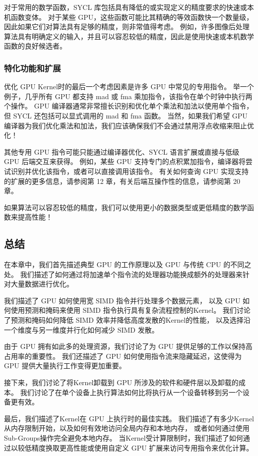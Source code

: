 对于常用的数学函数，SYCL 库包括具有降低的或实现定义的精度要求的快速或本机函数变体。 
对于某些 GPU，这些函数可能比其精确的等效函数快一个数量级，因此如果它们对算法具有足够的精度，则非常值得考虑。 
例如，许多图像后处理算法具有明确定义的输入，并且可以容忍较低的精度，因此是使用快速或本机数学函数的良好候选者。

\subsubsection{特化功能和扩展}
优化 GPU Kernel时的最后一个考虑因素是许多 GPU 中常见的专用指令。 
举一个例子，几乎所有 GPU 都支持 mad 或 fma 乘加指令，该指令在单个时钟中执行两个操作。 
GPU 编译器通常非常擅长识别和优化单个乘法和加法以使用单个指令，但 SYCL 还包括可以显式调用的 mad 和 fma 函数。 
当然，如果我们希望 GPU 编译器为我们优化乘法和加法，我们应该确保我们不会通过禁用浮点收缩来阻止优化！

其他专用 GPU 指令可能只能通过编译器优化、SYCL 语言扩展或直接与低级 GPU 后端交互来获得。 
例如，某些 GPU 支持专门的点积累加指令，编译器将尝试识别并优化该指令，或者可以直接调用该指令。 
有关如何查询 GPU 实现支持的扩展的更多信息，请参阅第 12 章，有关后端互操作性的信息，请参阅第 20 章。

\begin{remark}
	如果算法可以容忍较低的精度，我们可以使用更小的数据类型或更低精度的数学函数来提高性能！
\end{remark}

\subsection{总结}
在本章中，我们首先描述典型 GPU 的工作原理以及 GPU 与传统 CPU 的不同之处。 
我们描述了如何通过将加速单个指令流的处理器功能换成额外的处理器来针对大量数据进行优化。

我们描述了 GPU 如何使用宽 SIMD 指令并行处理多个数据元素，
以及 GPU 如何使用预测和掩码来使用 SIMD 指令执行具有复杂流程控制的Kernel。 
我们讨论了预测和掩码如何降低 SIMD 效率并降低高度发散的Kernel的性能，
以及选择沿一个维度与另一维度并行化如何减少 SIMD 发散。

由于 GPU 拥有如此多的处理资源，我们讨论了为 GPU 提供足够的工作以保持高占用率的重要性。 
我们还描述了 GPU 如何使用指令流来隐藏延迟，这使得为 GPU 提供大量执行工作变得更加重要。

接下来，我们讨论了将Kernel卸载到 GPU 所涉及的软件和硬件层以及卸载的成本。 
我们讨论了在单个设备上执行算法如何比将执行从一个设备转移到另一个设备更有效。

最后，我们描述了Kernel在 GPU 上执行时的最佳实践。 
我们描述了有多少Kernel从内存限制开始，以及如何有效地访问全局内存和本地内存，
或者如何通过使用Sub-Groups操作完全避免本地内存。 
当Kernel受计算限制时，我们描述了如何通过以较低精度换取更高性能或使用自定义 GPU 扩展来访问专用指令来优化计算。

